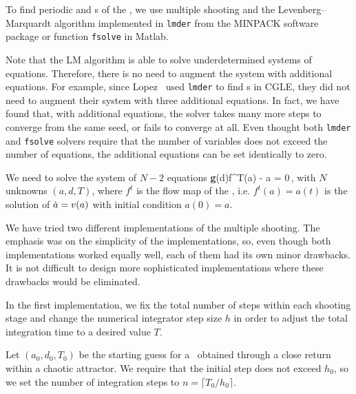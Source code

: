 

To find periodic and \rpo s of the \KSe , we use multiple shooting and
the Levenberg--Marquardt algorithm implemented in {\tt lmder} from
the MINPACK software package or function {\tt fsolve} in Matlab.

Note that the LM algorithm is able to solve underdetermined systems of
equations.  Therefore, there is no need to augment the system with
additional equations.  For example, since Lopez \etal\ used 
{\tt lmder} to find \rpo s in CGLE, they did not need to augment 
their system with three additional equations.  In fact, we have found
that, with additional equations, the solver takes many more steps to
converge from the same seed, or fails to converge at all.
Even thought both {\tt lmder} and {\tt fsolve} solvers 
require that the number of variables does not exceed the number 
of equations, the additional equations can be set identically to 
zero. 

We need to solve the system of $N-2$ equations
\beq
  {\bf g}(d)f^T(a) - a = 0\,, 
with $N$ unknowns $(a, d, T)$, where $f^t$ is the flow map of the 
\KSe , i.e. $f^t(a) = a(t)$ is the solution of 
$\dot{a} = v(a)$ with initial condition $a(0) = a$.

We have tried two different implementations of the multiple shooting.
The emphasis was on the simplicity of the implementations, so, even 
though both implementations worked equally well, each of them had 
its own minor drawbacks.  It is not difficult to design more 
sophisticated implementations where these drawbacks would be 
eliminated.

In the first implementation, we fix the total number of steps within 
each shooting stage and change the numerical integrator step size $h$
in order to adjust the total integration time to a desired value $T$.

Let $(a_0, d_0, T_0)$ be the starting guess for a \rpo\ obtained 
through a close return within a chaotic attractor.  We require
that the initial step does not exceed $h_0$, so we set
the number of integration steps to $n = \lceil T_0/h_0\rceil$.

